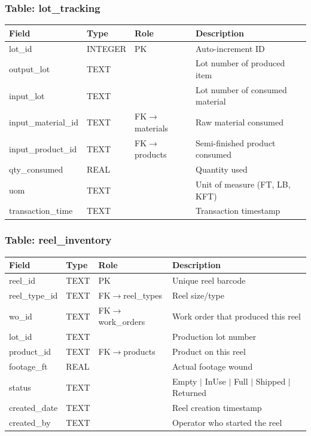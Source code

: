 \documentclass[11pt]{article}
\begin{document}
\subsubsection*{Table: lot\_tracking}
\begin{table}[H]\centering\small
\begin{tabular}{@{} l l l L{5.0cm} @{}}
\toprule
\textbf{Field} & \textbf{Type} & \textbf{Role} & \textbf{Description} \\
\midrule
lot\_id             & INTEGER & PK  & Auto-increment ID \\
output\_lot         & TEXT    &     & Lot number of produced item \\
input\_lot          & TEXT    &     & Lot number of consumed material \\
input\_material\_id & TEXT    & FK$\to$materials & Raw material consumed \\
input\_product\_id  & TEXT    & FK$\to$products & Semi-finished product consumed \\
qty\_consumed       & REAL    &     & Quantity used \\
uom                & TEXT    &     & Unit of measure (FT, LB, KFT) \\
transaction\_time   & TEXT    &     & Transaction timestamp \\
\bottomrule
\end{tabular}
\end{table}

\subsubsection*{Table: reel\_inventory}
\begin{table}[H]\centering\small
\begin{tabular}{@{} l l l L{5.0cm} @{}}
\toprule
\textbf{Field} & \textbf{Type} & \textbf{Role} & \textbf{Description} \\
\midrule
reel\_id       & TEXT    & PK  & Unique reel barcode \\
reel\_type\_id & TEXT    & FK$\to$reel\_types & Reel size/type \\
wo\_id         & TEXT    & FK$\to$work\_orders & Work order that produced this reel \\
lot\_id        & TEXT    &     & Production lot number \\
product\_id    & TEXT    & FK$\to$products & Product on this reel \\
footage\_ft    & REAL    &     & Actual footage wound \\
status         & TEXT    &     & Empty $\mid$ InUse $\mid$ Full $\mid$ Shipped $\mid$ Returned \\
created\_date  & TEXT    &     & Reel creation timestamp \\
created\_by    & TEXT    &     & Operator who started the reel \\
\bottomrule
\end{tabular}
\end{table}
\end{document}
